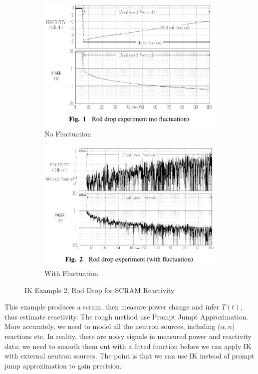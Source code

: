 \documentclass{school-22.211-notes}
\begin{document}
  \begin{figure}[ht]
    \begin{subfigure}[b]{0.45\textwidth}
      \centering
      \includegraphics[width=\textwidth]{images/pke/ik-ex2a.png}      
      \caption{No Fluctuation} \label{ik-ex2a} 
    \end{subfigure}
    \begin{subfigure}[b]{0.45\textwidth}
      \centering
      \includegraphics[width=\textwidth]{images/pke/ik-ex2b.png}      
      \caption{With Fluctuation} \label{ik-ex2b} 
    \end{subfigure}
    \caption{IK Example 2, Rod Drop for SCRAM Reactivity} \label{ik-ex2}
  \end{figure}
This example produces a scram, then measure power change and infer $T(t)$, thus estimate reactivity. The rough method use Prompt Jumpt Approximation. More accurately, we need to model all the neutron sources, including ($\alpha,n$) reactions etc. In reality, there are noisy signals in measured power and reactivity data; we need to smooth them out with a fitted function before we can apply IK with external neutron sources. The point is that we can use IK instead of prompt jump approximation to gain precision. 
\end{document}
